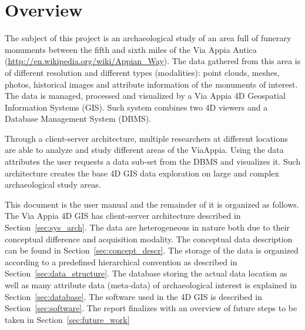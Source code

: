 \section{Overview}
\label{sec:dataman_overview}

The subject of this project is an archaeological study of an area full of
funerary monuments between the fifth and sixth miles of the Via Appia
Antica ({\url{http://en.wikipedia.org/wiki/Appian_Way}}).
The data gathered from this area is of different resolution and different
types (modalities): point clouds, meshes, photos, historical images and
attribute information of the monuments of interest. The data is managed,
processed and visualized by a Via Appia 4D Geospatial Information Systems (GIS).
Such system combines two 4D viewers and a Database Management System (DBMS).

Through a client-server architecture, multiple researchers at different locations
are able to analyze and study different areas of the ViaAppia. Using the data
attributes the user requests a data sub-set from the DBMS and visualizes it.
Such architecture creates the base 4D GIS data exploration on large and complex
archaeological study areas.

This document is the user manual and the remainder of it is organized as follows.
The Via Appia 4D GIS has client-server architecture described in Section~\ref{sec:sys_arch}.
The data are heterogeneous in nature both due to their
conceptual difference and acquisition modality. The conceptual data description
can be found in Section~\ref{sec:concept_descr}. The storage of the data is
organized according to a predefined hierarchical convention as described in
Section~\ref{sec:data_structure}. The database storing the actual data location as
well as many attribute data (meta-data) of archaeological interest is
explained in Section~\ref{sec:database}. The software used in the 4D GIS is
described in Section~\ref{sec:software}. The report finalizes with an overview
of future steps to be taken in Section~\ref{sec:future_work}
